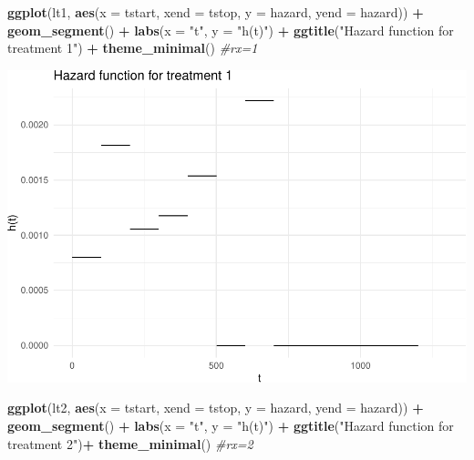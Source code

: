\documentclass[
]{article}
\newenvironment{Shaded}{\begin{snugshade}}{\end{snugshade}}
\newcommand{\AttributeTok}[1]{\textcolor[rgb]{0.13,0.29,0.53}{#1}}
\newcommand{\CommentTok}[1]{\textcolor[rgb]{0.56,0.35,0.01}{\textit{#1}}}
\newcommand{\FunctionTok}[1]{\textcolor[rgb]{0.13,0.29,0.53}{\textbf{#1}}}
\newcommand{\NormalTok}[1]{#1}
\newcommand{\SpecialCharTok}[1]{\textcolor[rgb]{0.81,0.36,0.00}{\textbf{#1}}}
\newcommand{\StringTok}[1]{\textcolor[rgb]{0.31,0.60,0.02}{#1}}
\begin{document}
\begin{Shaded}
\begin{Highlighting}[]
\FunctionTok{ggplot}\NormalTok{(lt1, }\FunctionTok{aes}\NormalTok{(}\AttributeTok{x =}\NormalTok{ tstart, }\AttributeTok{xend =}\NormalTok{ tstop, }\AttributeTok{y =}\NormalTok{ hazard, }\AttributeTok{yend =}\NormalTok{ hazard)) }\SpecialCharTok{+}
  \FunctionTok{geom\_segment}\NormalTok{() }\SpecialCharTok{+}
  \FunctionTok{labs}\NormalTok{(}\AttributeTok{x =} \StringTok{"t"}\NormalTok{, }\AttributeTok{y =} \StringTok{"h(t)"}\NormalTok{) }\SpecialCharTok{+}
  \FunctionTok{ggtitle}\NormalTok{(}\StringTok{"Hazard function for treatment 1"}\NormalTok{) }\SpecialCharTok{+}
  \FunctionTok{theme\_minimal}\NormalTok{() }\CommentTok{\#rx=1}
\end{Highlighting}
\end{Shaded}

\includegraphics{HW3_files/figure-latex/unnamed-chunk-3-1.pdf}

\begin{Shaded}
\begin{Highlighting}[]
\FunctionTok{ggplot}\NormalTok{(lt2, }\FunctionTok{aes}\NormalTok{(}\AttributeTok{x =}\NormalTok{ tstart, }\AttributeTok{xend =}\NormalTok{ tstop, }\AttributeTok{y =}\NormalTok{ hazard, }\AttributeTok{yend =}\NormalTok{ hazard)) }\SpecialCharTok{+}
  \FunctionTok{geom\_segment}\NormalTok{() }\SpecialCharTok{+}
  \FunctionTok{labs}\NormalTok{(}\AttributeTok{x =} \StringTok{"t"}\NormalTok{, }\AttributeTok{y =} \StringTok{"h(t)"}\NormalTok{) }\SpecialCharTok{+}
  \FunctionTok{ggtitle}\NormalTok{(}\StringTok{"Hazard function for treatment 2"}\NormalTok{)}\SpecialCharTok{+}
  \FunctionTok{theme\_minimal}\NormalTok{() }\CommentTok{\#rx=2}
\end{Highlighting}
\end{Shaded}
\end{document}
